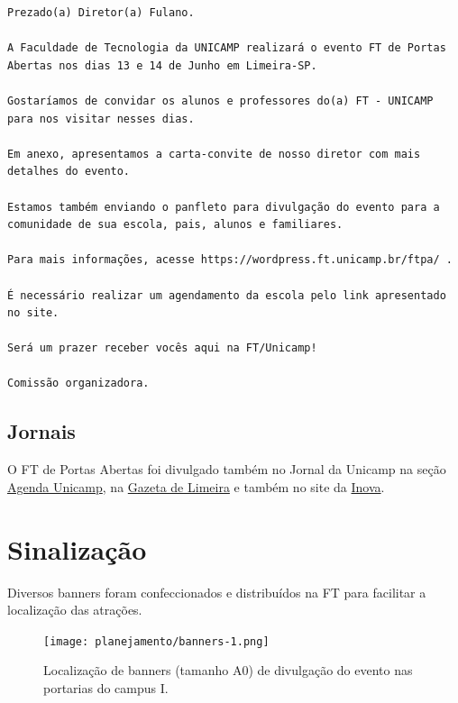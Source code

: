 \documentclass[
  letterpaper,
  DIV=11,
  numbers=noendperiod]{scrreprt}
\begin{document}
\begin{verbatim}
Prezado(a) Diretor(a) Fulano.

A Faculdade de Tecnologia da UNICAMP realizará o evento FT de Portas Abertas nos dias 13 e 14 de Junho em Limeira-SP.

Gostaríamos de convidar os alunos e professores do(a) FT - UNICAMP para nos visitar nesses dias.

Em anexo, apresentamos a carta-convite de nosso diretor com mais detalhes do evento.

Estamos também enviando o panfleto para divulgação do evento para a comunidade de sua escola, pais, alunos e familiares.

Para mais informações, acesse https://wordpress.ft.unicamp.br/ftpa/ .

É necessário realizar um agendamento da escola pelo link apresentado no site.

Será um prazer receber vocês aqui na FT/Unicamp! 

Comissão organizadora.
\end{verbatim}

\subsection{Jornais}\label{jornais}

O FT de Portas Abertas foi divulgado também no Jornal da Unicamp na
seção
\href{https://jornal.unicamp.br/agenda/2025/05/06/faculdade-de-tecnologia-realiza-a-edicao-2025-do-evento-ft-de-portas-abertas/\#:~:text=Nos\%20dias\%2013\%20e\%2014\%20de\%20junho\%20de\%202025\%2C\%20a,e\%20tecnol\%C3\%B3gica\%20oferecidas\%20pela\%20institui\%C3\%A7\%C3\%A3o.}{Agenda
Unicamp}, na \href{https://instagram.com/p/DJZ7ulQBLoF/}{Gazeta de
Limeira} e também no site da
\href{https://www.inova.unicamp.br/2025/05/inova-unicamp-estara-no-ft-de-portas-abertas-em-limeira/}{Inova}.

\section{Sinalização}\label{sinalizauxe7uxe3o}

Diversos banners foram confeccionados e distribuídos na FT para
facilitar a localização das atrações.

\begin{figure}[H]

{\centering \texttt{[image: planejamento/banners-1.png]}

}

\caption{Localização de banners (tamanho A0) de divulgação do evento nas
portarias do campus I.}

\end{figure}%
\end{document}
